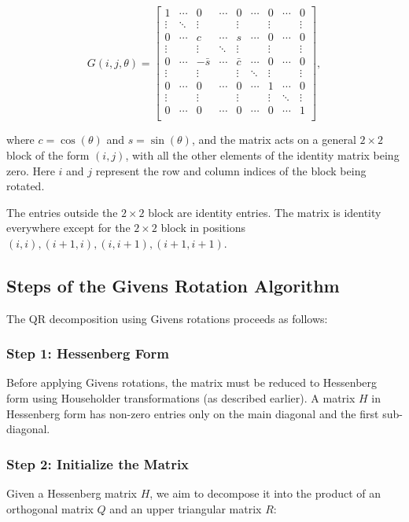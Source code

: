 \documentclass[12pt]{article}
\begin{document}
\[
G(i, j, \theta) =
\begin{bmatrix}
1 &\cdots& 0& \cdots& 0 &\cdots& 0 &\cdots& 0 \\
\vdots &\ddots& \vdots && \vdots && \vdots&& \vdots \\
0 &\cdots& c & \cdots& s &\cdots & 0&\cdots& 0 \\
\vdots && \vdots &\ddots& \vdots && \vdots&& \vdots \\
0 &\cdots& -\bar{s}& \cdots& \bar{c} &\cdots& 0 &\cdots& 0\\
\vdots && \vdots && \vdots &\ddots& \vdots&& \vdots \\
0 &\cdots& 0 & \cdots& 0 &\cdots & 1&\cdots& 0\\
\vdots && \vdots && \vdots && \vdots &\ddots& \vdots \\
0 &\cdots& 0 & \cdots& 0 &\cdots &0&\cdots& 1\\

\end{bmatrix},
\]

where \( c = \cos(\theta) \) and \( s = \sin(\theta) \), and the matrix acts on a general \( 2 \times 2 \) block of the form \( (i, j) \), with all the other elements of the identity matrix being zero. Here \( i \) and \( j \) represent the row and column indices of the block being rotated.

The entries outside the \( 2 \times 2 \) block are identity entries. The matrix is identity everywhere except for the \( 2 \times 2 \) block in positions \( (i,i), (i+1,i), (i,i+1), (i+1,i+1) \).


\subsection{Steps of the Givens Rotation Algorithm}

The QR decomposition using Givens rotations proceeds as follows:

\subsubsection{Step 1: Hessenberg Form}
Before applying Givens rotations, the matrix must be reduced to Hessenberg form using Householder transformations (as described earlier). A matrix \( H \) in Hessenberg form has non-zero entries only on the main diagonal and the first sub-diagonal.

\subsubsection{Step 2: Initialize the Matrix}
Given a Hessenberg matrix \( H \), we aim to decompose it into the product of an orthogonal matrix \( Q \) and an upper triangular matrix \( R \):
\end{document}

